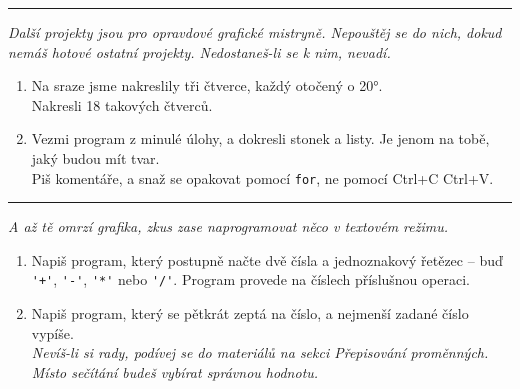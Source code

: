 \documentclass[a4paper,10pt]{article}
\newcommand\startsection[1]{
     \vspace{0.2ex}
    \hrule
    {\fontspec{Oxygen} \tiny
     \vspace{-1ex}
     \emph{#1}
     \vspace{-1.5em}
    }
}
\begin{document}
\startsection{Další projekty jsou pro opravdové grafické mistryně. Nepouštěj se do nich, dokud nemáš hotové ostatní projekty.
Nedostaneš-li se k nim, nevadí.}

\begin{enumerate}[resume]
\item Na sraze jsme nakreslily tři čtverce, každý otočený o 20°.
    \\Nakresli 18 takových čtverců.

\item Vezmi program z minulé úlohy, a dokresli stonek a listy.
    Je jenom na tobě, jaký budou mít tvar.
    \\Piš komentáře, a snaž se opakovat pomocí \verb+for+,
        ne pomocí Ctrl+C Ctrl+V.

\end{enumerate}

\startsection{A až tě omrzí grafika, zkus zase naprogramovat něco v textovém režimu.}

\begin{enumerate}[resume]
\item Napiš program, který postupně načte dvě čísla a jednoznakový řetězec
    – buď \verb!'+'!, \verb!'-'!, \verb!'*'! nebo \verb!'/'!.
    Program provede na číslech příslušnou operaci.

\item Napiš program, který se pětkrát zeptá na číslo, a nejmenší zadané číslo vypíše.
    \\\emph{\small Nevíš-li si rady, podívej se do materiálů na sekci Přepisování proměnných.
            Místo sečítání budeš vybírat správnou hodnotu.}

\end{enumerate}
\end{document}
